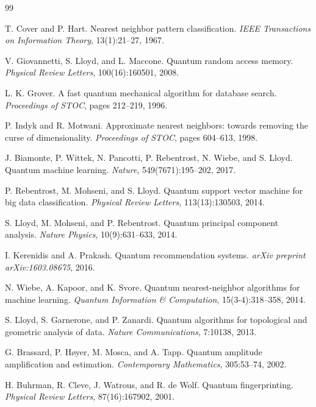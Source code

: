 \documentclass[11pt]{article}
\begin{document}

\begin{thebibliography}{99}

T. Cover and P. Hart.
\newblock Nearest neighbor pattern classification.
\newblock \textit{IEEE Transactions on Information Theory}, 13(1):21--27, 1967.

V. Giovannetti, S. Lloyd, and L. Maccone.
\newblock Quantum random access memory.
\newblock \textit{Physical Review Letters}, 100(16):160501, 2008.

L. K. Grover.
\newblock A fast quantum mechanical algorithm for database search.
\newblock \textit{Proceedings of STOC}, pages 212--219, 1996.

P. Indyk and R. Motwani.
\newblock Approximate nearest neighbors: towards removing the curse of dimensionality.
\newblock \textit{Proceedings of STOC}, pages 604--613, 1998.

J. Biamonte, P. Wittek, N. Pancotti, P. Rebentrost, N. Wiebe, and S. Lloyd.
\newblock Quantum machine learning.
\newblock \textit{Nature}, 549(7671):195--202, 2017.

P. Rebentrost, M. Mohseni, and S. Lloyd.
\newblock Quantum support vector machine for big data classification.
\newblock \textit{Physical Review Letters}, 113(13):130503, 2014.

S. Lloyd, M. Mohseni, and P. Rebentrost.
\newblock Quantum principal component analysis.
\newblock \textit{Nature Physics}, 10(9):631--633, 2014.

I. Kerenidis and A. Prakash.
\newblock Quantum recommendation systems.
\newblock \textit{arXiv preprint arXiv:1603.08675}, 2016.

N. Wiebe, A. Kapoor, and K. Svore.
\newblock Quantum nearest-neighbor algorithms for machine learning.
\newblock \textit{Quantum Information \& Computation}, 15(3-4):318--358, 2014.

S. Lloyd, S. Garnerone, and P. Zanardi.
\newblock Quantum algorithms for topological and geometric analysis of data.
\newblock \textit{Nature Communications}, 7:10138, 2013.

G. Brassard, P. Høyer, M. Mosca, and A. Tapp.
\newblock Quantum amplitude amplification and estimation.
\newblock \textit{Contemporary Mathematics}, 305:53--74, 2002.

H. Buhrman, R. Cleve, J. Watrous, and R. de Wolf.
\newblock Quantum fingerprinting.
\newblock \textit{Physical Review Letters}, 87(16):167902, 2001.

\end{thebibliography}
\end{document}
